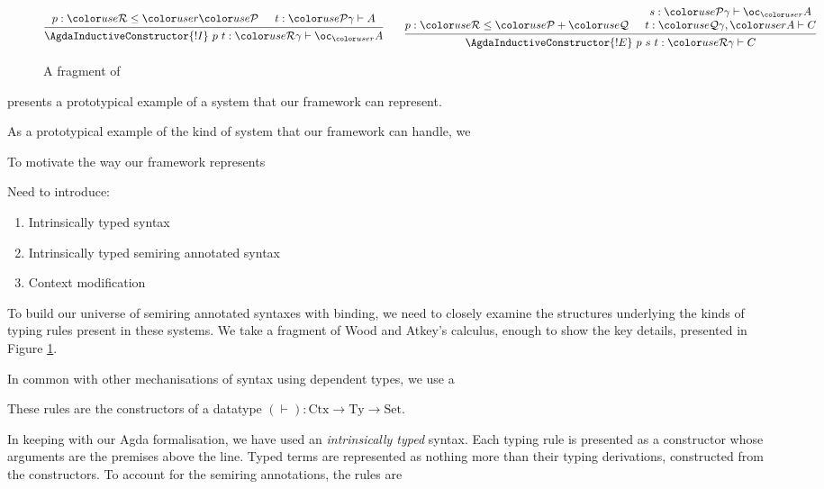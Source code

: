 \begin{figure}
\begin{displaymath}
  \end{displaymath}
  \begin{displaymath}
    \begin{prooftree}
      \hypo{p : \grR \leq \gr r\grP}
      \hypo{t : \grP\gamma \vdash A}
      \infer2{\AgdaInductiveConstructor{!I}~p~t : \grR\gamma \vdash \oc_{\gr r} A}
    \end{prooftree}
    \qquad
    \begin{prooftree}
      \hypo{p : \grR \leq \grP + \grQ}
      \hypo{s : \grP\gamma \vdash \oc_{\gr r} A}
      \infer[no rule]1{t : \grQ\gamma, \gr rA \vdash C}
      \infer2{\AgdaInductiveConstructor{!E}~p~s~t : \grR\gamma \vdash C}
    \end{prooftree}
  \end{displaymath}
  \caption{A fragment of \name{}}\label{fig:lr}
\end{figure}

 presents a prototypical example of a system that our
framework can represent.

As a prototypical example of the kind of system that our framework can
handle, we

To motivate the way our framework represents






Need to introduce:
\begin{enumerate}
\item Intrinsically typed syntax
\item Intrinsically typed semiring annotated syntax
\item Context modification
\end{enumerate}




To build our universe of semiring annotated syntaxes with binding, we
need to closely examine the structures underlying the kinds of typing
rules present in these systems. We take a fragment of Wood and Atkey's
\name{} calculus, enough to show the key details, presented in
Figure \ref{fig:lr}.


In common with other mechanisations of syntax using dependent types,
we use a

These rules are the constructors of a datatype
$(\vdash) : \mathrm{Ctx} \to \mathrm{Ty} \to \mathrm{Set}$.



In keeping with our Agda formalisation, we have used an
\emph{intrinsically typed} syntax. Each typing rule is presented as a
constructor whose arguments are the premises above the line. Typed
terms are represented as nothing more than their typing derivations,
constructed from the constructors. To account for the semiring
annotations, the rules are

